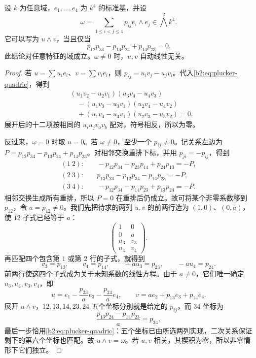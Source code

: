 \begin{proposition}[四维空间中二重楔积的判据]\label{b2:prop:plucker-four-dimensional}
	设 \(k\) 为任意域，\(e_1,\ldots,e_4\) 为 \(k^4\) 的标准基，并设
	\[
		\omega=\sum_{1\le i<j\le4}p_{ij}e_i\wedge e_j\in\bigwedge^2k^4.
	\]
	它可以写为 \(u\wedge v\)，当且仅当
	\begin{equation}\label{b2:eq:plucker-quadric}
		p_{12}p_{34}-p_{13}p_{24}+p_{14}p_{23}=0.
	\end{equation}
	此结论对任意特征的域成立。\(\omega\ne0\) 时，\(u,v\) 自动线性无关。
\end{proposition}
\begin{proof}
	若 \(u=\sum u_ie_i\)、\(v=\sum v_ie_i\)，则 \(p_{ij}=u_iv_j-u_jv_i\)。代入\eqref{b2:eq:plucker-quadric}，得到
	\[
		\begin{aligned}
			&(u_1v_2-u_2v_1)(u_3v_4-u_4v_3)\\
			&\quad-(u_1v_3-u_3v_1)(u_2v_4-u_4v_2)\\
			&\quad+(u_1v_4-u_4v_1)(u_2v_3-u_3v_2)=0.
		\end{aligned}
	\]
	展开后的十二项按相同的 \(u_iu_jv_av_b\) 配对，符号相反，所以为零。

	反过来，\(\omega=0\) 时取 \(u=0\)。若 \(\omega\ne0\)，至少一个 \(p_{ij}\ne0\)。记关系左边为 \(P=p_{12}p_{34}-p_{13}p_{24}+p_{14}p_{23}\)。对相邻交换重排下标，并用 \(p_{ji}=-p_{ij}\)，得到
	\[
		\begin{aligned}
			(1\ 2):&\quad -p_{12}p_{34}-p_{23}p_{14}+p_{24}p_{13}=-P,\\
			(2\ 3):&\quad p_{13}p_{24}-p_{12}p_{34}-p_{14}p_{23}=-P,\\
			(3\ 4):&\quad -p_{12}p_{34}-p_{14}p_{23}+p_{13}p_{24}=-P.
		\end{aligned}
	\]
	相邻交换生成所有重排，所以 \(P=0\) 在重排后仍成立。故可将某个非零系数移到 \(p_{12}\)，令 \(a=p_{12}\ne0\)。我们先把待求的两列 \(u,v\) 的前两行选为 \((1,0)\)、\((0,a)\)，使 \(12\) 子式已经等于 \(a\)：
	\[
		\begin{pmatrix}
			1&0\\
			0&a\\
			u_3&v_3\\
			u_4&v_4
		\end{pmatrix}.
	\]
	再匹配四个包含第 \(1\) 或第 \(2\) 行的子式，就得到
	\[
		v_3=p_{13},\qquad v_4=p_{14},\qquad -a u_3=p_{23},\qquad -a u_4=p_{24}.
	\]
	前两行使这四个子式成为关于未知系数的线性方程。由于 \(a\ne0\)，它们唯一确定 \(u_3,u_4,v_3,v_4\)，即
	\[
		u=e_1-\frac{p_{23}}a e_3-\frac{p_{24}}a e_4, \qquad v=a e_2+p_{13}e_3+p_{14}e_4.
	\]
	展开 \(u\wedge v\)，\(12,13,14,23,24\) 五个坐标分别就是给定的 \(p_{ij}\)，而 \(34\) 坐标为
	\[
		\frac{p_{13}p_{24}-p_{14}p_{23}}a=p_{34},
	\]
	最后一步恰用\eqref{b2:eq:plucker-quadric}：五个坐标已由所选两列实现，二次关系保证剩下的第六个坐标也匹配。故 \(u\wedge v=\omega\)。若 \(u,v\) 相关，其楔积为零，所以非零情形下它们独立。
\end{proof}

